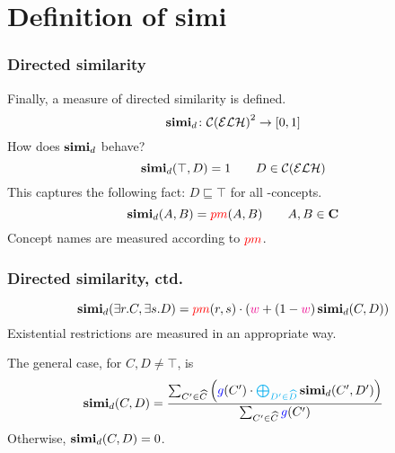\documentclass[smaller]{beamer}
\begin{document}
\section{Definition of simi}

\begin{frame}
  \frametitle{Directed similarity}
  Finally, a measure of \alert{directed similarity} is defined.
  \begin{equation}
    \simi_d \colon {\mathcal{C}(\mathcal{ELH})}^2%
    \to [0,1]
  \end{equation}
  How does \(\operatorname{\mathbf{simi}}_d\) behave?
  \begin{equation}
    \operatorname{\mathbf{simi}}_d(\top,D) = 1 \qquad D \in \mathcal{C}(\mathcal{ELH})
  \end{equation}
  This captures the following fact: \(D \sqsubseteq \top\)
  for all \elh-concepts.
  \begin{equation}
    \operatorname{\mathbf{simi}}_d(A,B) = \textcolor{red}{pm}(A,B) \qquad A,B \in \mathbf{C}
  \end{equation}
  Concept names are measured according to \(\textcolor{red}{pm}\).
\end{frame}

\begin{frame}
  \frametitle{Directed similarity, ctd.}
  \begin{equation}
    \operatorname{\mathbf{simi}}_d(\exists{}r.C,\exists{}s.D) =
    \textcolor{red}{pm}(r,s) \cdot 
    \left(\textcolor{magenta}{w} + 
    (1-\textcolor{magenta}{w})\operatorname{\mathbf{simi}}_d(C,D)\right)
  \end{equation}
  Existential restrictions are measured in an
  appropriate way.

  The general case, for \(C,D \ne \top\), is
  \begin{equation}
    \simi_d(C,D) =
    \frac{\sum_{C^\prime \in \widehat{C}}\left(\textcolor{blue}{g}(C^\prime) \cdot \textcolor{cyan}{\bigoplus_{D^\prime \in \widehat{D}}} \simi_d(C^\prime, D^\prime)\right)}%
    {\sum_{C^\prime \in \widehat{C}}\textcolor{blue}{g}(C^\prime)}
  \end{equation}
  Otherwise, \(\operatorname{\mathbf{simi}}_d(C,D) = 0\).
\end{frame}
\end{document}
